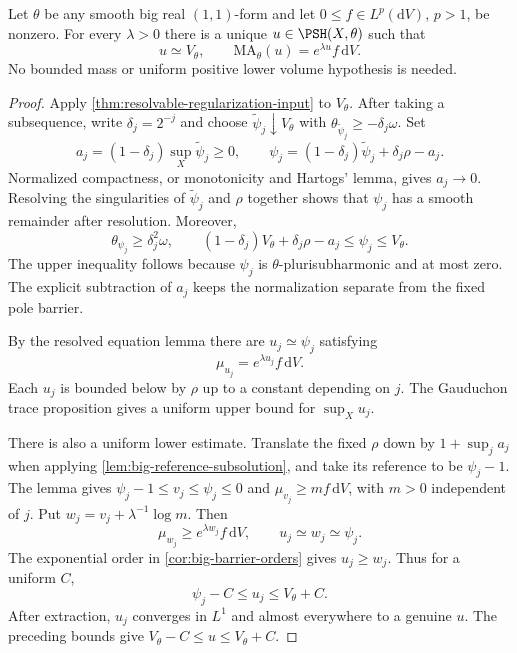 \begin{theorem}\label{thm:big-minimal-exponential}
Let $\theta$ be any smooth big real $(1,1)$-form and let $0\leq f\in L^p(\mathrm{d}V)$, $p>1$, be nonzero. For every $\lambda>0$ there is a unique $u\in\PSH(X,\theta)$ such that
\[
 u\simeq V_\theta,\qquad
 \mathrm{MA}_\theta(u)=e^{\lambda u}f\,\mathrm{d}V.
\]
No bounded mass or uniform positive lower volume hypothesis is needed.
\end{theorem}
\begin{proof}
Apply \cref{thm:resolvable-regularization-input} to $V_\theta$. After taking a subsequence, write $\delta_j=2^{-j}$ and choose $\widetilde\psi_j\downarrow V_\theta$ with
$\theta_{\widetilde\psi_j}\geq-\delta_j\omega$. Set
\[
 a_j=(1-\delta_j)\sup_X\widetilde\psi_j\geq0,
 \qquad
 \psi_j=(1-\delta_j)\widetilde\psi_j+\delta_j\rho-a_j.
\]
Normalized compactness, or monotonicity and Hartogs' lemma, gives $a_j\to0$. Resolving the singularities of $\widetilde\psi_j$ and $\rho$ together shows that $\psi_j$ has a smooth remainder after resolution. Moreover,
\begin{equation}\label{eq:big-minimal-approximation}
 \theta_{\psi_j}\geq\delta_j^2\omega,
 \qquad
 (1-\delta_j)V_\theta+\delta_j\rho-a_j
 \leq\psi_j\leq V_\theta.
\end{equation}
The upper inequality follows because $\psi_j$ is $\theta$-plurisubharmonic and at most zero. The explicit subtraction of $a_j$ keeps the normalization separate from the fixed pole barrier.

By the resolved equation lemma there are $u_j\simeq\psi_j$ satisfying
\[
 \mu_{u_j}=e^{\lambda u_j}f\,\mathrm{d}V.
\]
Each $u_j$ is bounded below by $\rho$ up to a constant depending on $j$. The Gauduchon trace proposition gives a uniform upper bound for $\sup_Xu_j$.

There is also a uniform lower estimate. Translate the fixed $\rho$ down by $1+\sup_j a_j$ when applying \cref{lem:big-reference-subsolution}, and take its reference to be $\psi_j-1$. The lemma gives $\psi_j-1\leq v_j\leq\psi_j\leq0$ and $\mu_{v_j}\geq mf\,\mathrm{d}V$, with $m>0$ independent of $j$. Put $w_j=v_j+\lambda^{-1}\log m$. Then
\[
 \mu_{w_j}\geq e^{\lambda w_j}f\,\mathrm{d}V,
 \qquad u_j\simeq w_j\simeq\psi_j.
\]
The exponential order in \cref{cor:big-barrier-orders} gives $u_j\geq w_j$. Thus for a uniform $C$,
\begin{equation}\label{eq:big-minimal-solution-bounds}
 \psi_j-C\leq u_j\leq V_\theta+C.
\end{equation}
After extraction, $u_j$ converges in $L^1$ and almost everywhere to a genuine $u$. The preceding bounds give $V_\theta-C\leq u\leq V_\theta+C$.


\end{proof}
